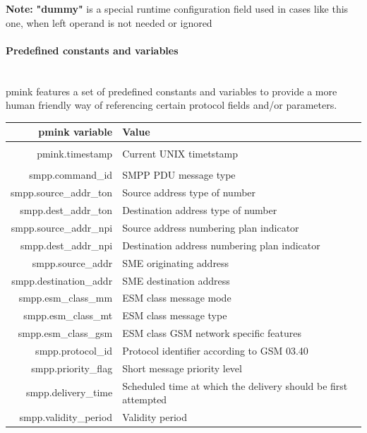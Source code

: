 \documentclass[a4paper,latin]{paper}
\begin{document}
\noindent{}\textbf{Note:} \textbf{"dummy"} is a special runtime configuration field used in cases like this one, when left operand is not needed or ignored

\paragraph{Predefined constants and variables}\label{SECTION_8_2_4_4}
\mbox{}\\
\acrfull{pmink} features a set of predefined constants and variables to provide a more human friendly way of referencing certain protocol fields and/or
parameters. 


\clearpage
\noindent
\begin{tabularx}{\linewidth}{ | >{\ttfamily} r | >{\ttfamily} X |}
	\hline
	\acrshort{pmink} variable		& Value \\
	\hline
	\rowcolor{blue!10}
	\multicolumn{2}{| l |}{\acrfull{pmink}}	\\
	\hline
	pmink.timestamp				& Current UNIX timetstamp \\ 
	\hline
	\rowcolor{blue!10}
	\multicolumn{2}{| l |}{\acrfull{smpp}} 	\\
	\hline
	smpp.command\_id			& SMPP PDU message type \\
	smpp.source\_addr\_ton			& Source address type of number\\
	smpp.dest\_addr\_ton			& Destination address type of number\\
	smpp.source\_addr\_npi			& Source address numbering plan indicator\\
	smpp.dest\_addr\_npi			& Destination address numbering plan indicator\\
	smpp.source\_addr			& SME originating address\\
	smpp.destination\_addr			& SME destination address\\
	smpp.esm\_class\_mm			& ESM class message mode\\
	smpp.esm\_class\_mt			& ESM class message type\\
	smpp.esm\_class\_gsm			& ESM class GSM network specific features\\
	smpp.protocol\_id			& Protocol identifier according to GSM 03.40\\
	smpp.priority\_flag			& Short message priority level\\
	smpp.delivery\_time			& Scheduled time at which the delivery should be first attempted\\
	smpp.validity\_period			& Validity period\\

\end{tabularx}
\end{document}
